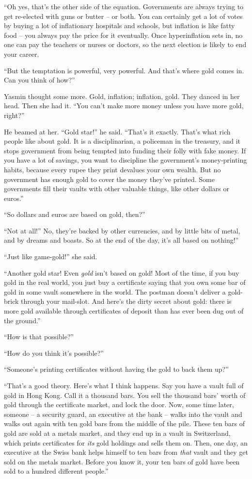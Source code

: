 ``Oh yes, that's the other side of the equation. Governments are
always trying to get re-elected with guns or butter -- or both. You
can certainly get a lot of votes by buying a lot of inflationary
hospitals and schools, but inflation is like fatty food -- you
always pay the price for it eventually. Once hyperinflation sets
in, no one can pay the teachers or nurses or doctors, so the next
election is likely to end your career.

``But the temptation is powerful, very powerful. And that's where
gold comes in. Can you think of how?''

Yasmin thought some more. Gold, inflation; inflation, gold. They
danced in her head. Then she had it. ``You can't make more money
unless you have more gold, right?''

He beamed at her. ``Gold star!'' he said. ``That's it exactly. That's
what rich people like about gold. It is a disciplinarian, a
policeman in the treasury, and it stops government from being
tempted into funding their folly with fake money. If you have a lot
of savings, you want to discipline the government's money-printing
habits, because every rupee they print devalues your own wealth.
But no government has enough gold to cover the money they've
printed. Some governments fill their vaults with other valuable
things, like other dollars or euros.''

``So dollars and euros are based on gold, then?''

``Not at all!'' No, they're backed by other currencies, and by little
bits of metal, and by dreams and boasts. So at the end of the day,
it's all based on nothing!''

``Just like game-gold!'' she said.

``Another gold star! Even \emph{gold} isn't based on gold! Most of
the time, if you buy gold in the real world, you just buy a
certificate saying that you own some bar of gold in some vault
somewhere in the world. The postman doesn't deliver a gold-brick
through your mail-slot. And here's the dirty secret about gold:
there is more gold available through certificates of deposit than
has ever been dug out of the ground.''

``How is that possible?''

``How do you think it's possible?''

``Someone's printing certificates without having the gold to back
them up?''

``That's a good theory. Here's what I think happens. Say you have a
vault full of gold in Hong Kong. Call it a thousand bars. You sell
the thousand bars' worth of gold through the certificate market,
and lock the door. Now, some time later, someone -- a security
guard, an executive at the bank -- walks into the vault and walks
out again with ten gold bars from the middle of the pile. These ten
bars of gold are sold at a metals market, and they end up in a
vault in Switzerland, which prints certificates for \emph{its} gold
holdings and sells them on. Then, one day, an executive at the
Swiss bank helps himself to ten bars from \emph{that} vault and
they get sold on the metals market. Before you know it, your ten
bars of gold have been sold to a hundred different people.''

